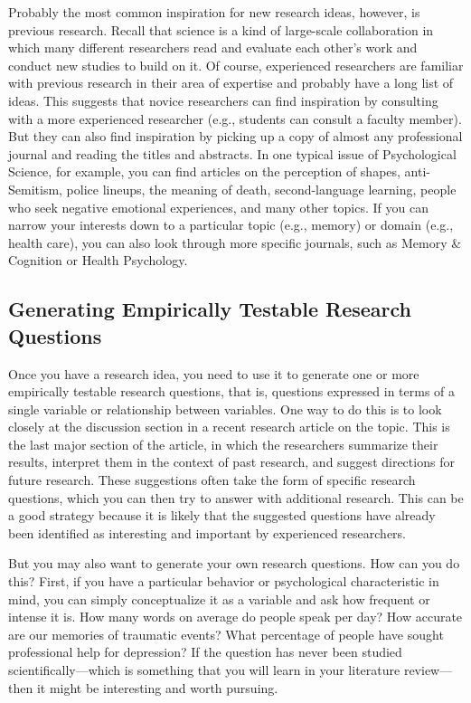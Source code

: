 \documentclass[]{book}
\theoremstyle{definition}
\theoremstyle{definition}
\theoremstyle{remark}
\begin{document}
Probably the most common inspiration for new research ideas, however, is
previous research. Recall that science is a kind of large-scale
collaboration in which many different researchers read and evaluate each
other's work and conduct new studies to build on it. Of course,
experienced researchers are familiar with previous research in their
area of expertise and probably have a long list of ideas. This suggests
that novice researchers can find inspiration by consulting with a more
experienced researcher (e.g., students can consult a faculty member).
But they can also find inspiration by picking up a copy of almost any
professional journal and reading the titles and abstracts. In one
typical issue of Psychological Science, for example, you can find
articles on the perception of shapes, anti-Semitism, police lineups, the
meaning of death, second-language learning, people who seek negative
emotional experiences, and many other topics. If you can narrow your
interests down to a particular topic (e.g., memory) or domain (e.g.,
health care), you can also look through more specific journals, such as
Memory \& Cognition or Health Psychology.

\subsection{Generating Empirically Testable Research
Questions}\label{generating-empirically-testable-research-questions}

Once you have a research idea, you need to use it to generate one or
more empirically testable research questions, that is, questions
expressed in terms of a single variable or relationship between
variables. One way to do this is to look closely at the discussion
section in a recent research article on the topic. This is the last
major section of the article, in which the researchers summarize their
results, interpret them in the context of past research, and suggest
directions for future research. These suggestions often take the form of
specific research questions, which you can then try to answer with
additional research. This can be a good strategy because it is likely
that the suggested questions have already been identified as interesting
and important by experienced researchers.

But you may also want to generate your own research questions. How can
you do this? First, if you have a particular behavior or psychological
characteristic in mind, you can simply conceptualize it as a variable
and ask how frequent or intense it is. How many words on average do
people speak per day? How accurate are our memories of traumatic events?
What percentage of people have sought professional help for depression?
If the question has never been studied scientifically---which is
something that you will learn in your literature review---then it might
be interesting and worth pursuing.
\end{document}
